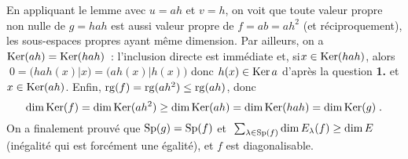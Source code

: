 \documentclass{article}
\begin{document}
En appliquant le lemme avec $u=ah$ et $v=h$, on voit que toute valeur propre non nulle de $g=hah$ est aussi valeur propre de $f=ab=ah^2$ (et r\'eciproquement), les sous-espaces propres ayant m\^eme dimension.\ssk\new
Par ailleurs, on a $\mathop{\rm Ker}\nolimits(ah)=\mathop{\rm Ker}\nolimits(hah)$~: l'inclusion directe est imm\'ediate et, si\break $x\in\mathop{\rm Ker}\nolimits(hah)$, alors $\;0=\big(hah(x)|x\big)=\big(ah(x)|h(x)\big)$ donc $h(x)\in\mathop{\rm Ker}\nolimits a$ d'apr\`es la question {\bf 1.} et $x\in\mathop{\rm Ker}\nolimits(ah)$. Enfin, $\mathop{\rm rg}\nolimits(f)=\mathop{\rm rg}\nolimits(ah^2)\leq\mathop{\rm rg}\nolimits(ah)$, donc\vv
$$\dim\mathop{\rm Ker}\nolimits(f)=\dim\mathop{\rm Ker}\nolimits(ah^2)\geq\dim\mathop{\rm Ker}\nolimits(ah)=\dim\mathop{\rm Ker}\nolimits(hah)=\dim\mathop{\rm Ker}\nolimits(g)\;.$$
On a finalement prouv\'e que $\mathop{\rm Sp}\nolimits(g)=\mathop{\rm Sp}\nolimits(f)$ et $\;\sum_{\lambda\in\mathop{\rm Sp}\nolimits(f)}\dim E_{\lambda}(f)\geq \dim E$ (in\'egalit\'e qui est forc\'ement une \'egalit\'e), et $f$ est diagonalisable.
\end{document}
